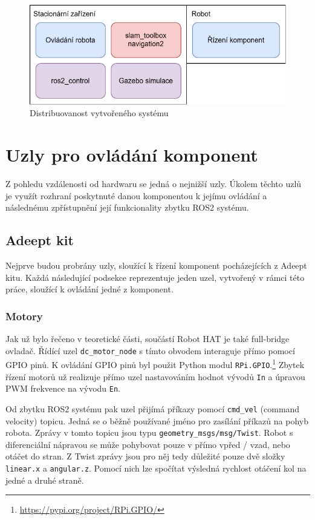 \begin{figure}[h!]
	\centering
	\includegraphics[scale=0.75]{obrazky-figures/distribuovanost.pdf}
	\caption{Distribuovanost vytvořeného systému}
	\label{fig:distribuovanost}
\end{figure}

\section{Uzly pro ovládání komponent}
Z pohledu vzdálenosti od hardwaru se jedná o nejnižší uzly. Úkolem těchto uzlů je využít rozhraní poskytnuté danou komponentou k jejímu ovládání a následnému zpřístupnění její funkcionality zbytku ROS2 systému.

\subsection*{Adeept kit}
Nejprve budou probrány uzly, sloužící k řízení komponent pocházejících z Adeept kitu. Každá následující podsekce reprezentuje jeden uzel, vytvořený v rámci této práce, sloužící k ovládání jedné z komponent.

\subsubsection*{Motory} \label{implementation:motors}
Jak už bylo řečeno v teoretické části, součástí Robot HAT je také full-bridge ovladač. Řídící uzel \verb|dc_motor_node| s tímto obvodem interaguje přímo pomocí GPIO pinů. K ovládání GPIO pinů byl použit Python modul \verb|RPi.GPIO|.\footnote{\url{https://pypi.org/project/RPi.GPIO/}} Zbytek řízení motorů už realizuje přímo uzel nastavováním hodnot vývodů \verb|In| a úpravou PWM frekvence na vývodu \verb|En|.

Od zbytku ROS2 systému pak uzel přijímá příkazy pomocí \verb|cmd_vel| (command velocity) topicu. Jedná se o běžně používané jméno pro zasílání příkazů na pohyb robota. Zprávy v tomto topicu jsou typu \verb|geometry_msgs/msg/Twist|. Robot s diferenciální nápravou se může pohybovat pouze v přímo vpřed / vzad, nebo otáčet do stran. Z Twist zprávy jsou pro něj tedy důležité pouze dvě složky \verb|linear.x| a \verb|angular.z|. Pomocí nich lze spočítat výsledná rychlost otáčení kol na jedné a druhé straně.

